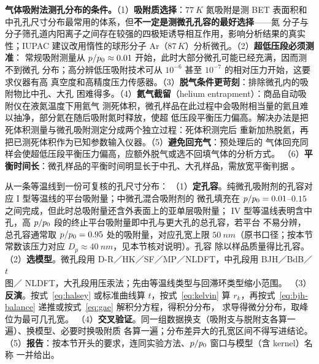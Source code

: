 \begin{measure}
\textbf{气体吸附法测孔分布的条件。}（1）\textbf{吸附质选择}：$\qty{77}{K}$ 氮吸附是测
BET 表面积和中孔孔尺寸分布最常用的体系，但\textbf{不一定是测微孔孔容的最好选择}——氮
分子与分子筛孔道内阳离子之间存在较强的四极矩诱导相互作用，影响分析结果的真实性；IUPAC
建议改用惰性的球形分子 Ar（$87\,\unit{K}$）分析微孔。（2）\textbf{超低压段必须测准}：
常规吸附测量从 $p/p_{0}\approx0.01$ 开始，此时大部分微孔可能已经充满，因而测不到微孔
分布；高分辨低压吸附技术可从 $10^{-6}$ 甚至 $10^{-7}$ 的相对压力开始，这要求仪器有高
真空度和高精度压力传感器。（3）\textbf{脱气条件更苛刻}：排除微孔内的吸附物比中孔、大孔
困难得多。（4）\textbf{氦气截留}（helium entrapment）：商品自动吸附仪在液氮温度下用氦气
测死体积，微孔样品在此过程中会吸附相当量的氦且难以抽净，部分氦在随后吸附氮时释放，使超
低压段平衡压力偏高。解决办法是把死体积测量与微孔吸附测定分成两个独立过程：死体积测完后
重新加热脱氦，再把已测死体积作为已知参数输入仪器。（5）\textbf{避免回充气}：预处理后的
气体回充同样会使超低压段平衡压力偏高，应额外脱气或选不回填气体的分析方式。
（6）\textbf{平衡时间长}：微孔样品的平衡时间明显长于中孔、大孔样品，需放宽平衡判据
。
\end{measure}

\begin{dataflow}
从一条等温线到一份可复核的孔尺寸分布：
（1）\textbf{定孔容}。纯微孔吸附剂的孔容对应 I 型等温线的平台吸附量；中微孔混合吸附剂的
微孔填充在 $p/p_{0}=0.01$--$0.15$ 之间完成，但此时总吸附量还含外表面上的亚单层吸附量；
IV 型等温线表明含中孔，高 $p/p_{0}$ 段的终止平台吸附量即中孔与更大孔的总孔容，若平台
不易分辨，总孔容通常取 $p/p_{0}=0.95$ 处的吸附量，对应孔宽上限 $\qty{50}{nm}$（原书口径；按本节常数该压力对应 $D_p\approx\qty{40}{nm}$，见本节核对说明）。孔容
除以样品质量得比孔容。
（2）\textbf{选模型}。微孔段用 D-R／HK／SF／MP／NLDFT，中孔段用 BJH／BdB／$t$ 图／
NLDFT，大孔段用压汞法；先由等温线类型与回滞环类型缩小范围。
（3）\textbf{反演}。按式~\eqref{eq:halsey} 或标准曲线算 $t$，按式~\eqref{eq:kelvin} 算
$r_k$，再按式~\eqref{eq:bjh-balance} 递推或按式~\eqref{eq:gae} 解积分方程，得积分分布，
求导得微分分布，取峰位为最可几孔宽。
（4）\textbf{交叉验证}。同一组数据换支（吸附支与脱附支各算一遍）、换模型、必要时换吸附质
各算一遍；分布差异大的孔宽区间不得写进结论。
（5）\textbf{报告}：按本节开头的要求，连同实验方法、$p/p_{0}$ 窗口与模型（含 kernel）名称
一并给出。
\end{dataflow}

